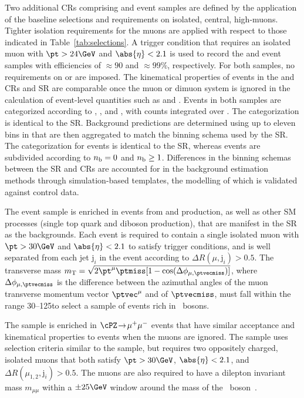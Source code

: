 Two additional CRs comprising \mj and \mmj event samples are defined
by the application of the baseline selections and requirements on
isolated, central, high-\pt muons. Tighter isolation requirements for
the muons are applied with respect to those indicated in
Table~\ref{tab:selections}.  A trigger condition that requires an
isolated muon with $\pt > 24\GeV$ and $\abs{\eta} < 2.1$ is used to
record the \mj and \mmj event samples with efficiencies of
${\approx}90$ and ${\approx}99\%$, respectively. For both samples, no
requirements on \alphat or \bdphi are imposed. The kinematical
properties of events in the \mj and \mmj CRs and SR are comparable
once the muon or dimuon system is ignored in the calculation of
event-level quantities such as \scalht and \mht.  Events in both
samples are categorized according to \njet, \scalht, and \nb, with
counts integrated over \mht. The \njet categorization is identical to
the SR. Background predictions are determined using up to eleven bins
in \scalht that are then aggregated to match the \scalht binning
schema used by the SR. The \nb categorization for \mj events is
identical to the SR, whereas \mmj events are subdivided according to
$n_{\mathrm{b}} = 0$ and $n_{\mathrm{b}} \geq 1$. Differences in the binning schemas between
the SR and CRs are accounted for in the background estimation methods
through simulation-based templates, the modelling of which is
validated against control data.

The \mj event sample is enriched in events from \wmj and \ttbar
production, as well as other SM processes (\eg single top quark and
diboson production), that are manifest in the SR as the \lost
backgrounds. Each event is required to contain a single isolated muon
with $\pt > 30\GeV$ and $\abs{\eta} < 2.1$ to satisfy trigger
conditions, and is well separated from each jet $\mathrm{j}_i$ in the
event according to ${\Delta}R(\mu,\mathrm{j}_i) > 0.5$. The transverse
mass $m_\mathrm{T} = \sqrt{\smash[b]{2\pt^\mu\ptmiss[1-
    \cos(\Delta\phi_{\mu,\ptvecmiss})]}}$, where
$\Delta\phi_{\mu,\ptvecmiss}$ is the difference between the azimuthal
angles of the muon transverse momentum vector $\ptvec^\mu$ and of
$\ptvecmiss$, must fall within the range 30--125\GeV to select a
sample of events rich in \PW\ bosons.

The \mmj sample is enriched in $\cPZ\! \to\!  \mu^+\mu^-$ events that
have similar acceptance and kinematical properties to \znunuj events
when the muons are ignored. The sample uses selection criteria similar
to the \mj sample, but requires two oppositely charged, isolated muons
that both satisfy $\pt > 30\GeV$, $\abs{\eta} < 2.1$, and
${\Delta}R(\mu_{1,2},\mathrm{j}_i) > 0.5$. The muons are also required
to have a dilepton invariant mass $m_{\mu\mu}$ within a ${\pm}25\GeV$
window around the mass of the \cPZ\ boson~\cite{Patrignani:2016xqp}.

